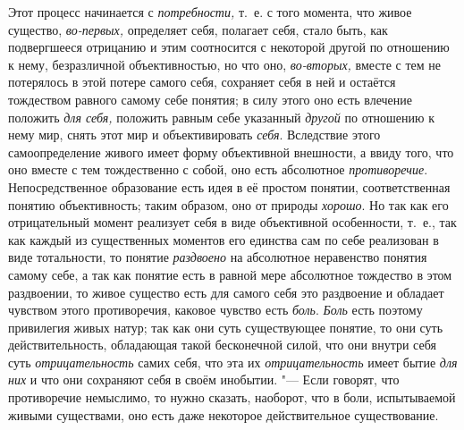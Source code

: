 Этот процесс начинается с
{\em потребности,} т.~е.
с того момента, что живое существо,
{\em во-первых,}
определяет себя, полагает себя, стало быть, как подвергшееся
отрицанию и этим соотносится с некоторой другой по отношению к нему,
безразличной объективностью, но что оно,
{\em во-вторых,} вместе с
тем не потерялось в этой потере самого себя, сохраняет себя в ней и
остаётся тождеством равного самому себе понятия; в силу этого оно есть
влечение положить {\em для себя,}
положить равным себе указанный
{\em другой} по отношению
к нему мир, снять этот мир и объективировать
{\em себя}. Вследствие
этого самоопределение живого имеет форму объективной внешности, а ввиду
того, что оно вместе с тем тождественно с собой, оно есть абсолютное
{\em противоречие}.
Непосредственное образование есть идея в её простом понятии,
соответственная понятию объективность; таким образом, оно от природы
{\em хорошо}. Но так как
его отрицательный момент реализует себя в виде объективной особенности,
т.~е., так как каждый из существенных моментов его единства сам по себе
реализован в виде тотальности, то понятие
{\em раздвоено} на
абсолютное неравенство понятия самому себе, а так как понятие есть в равной
мере абсолютное тождество в этом раздвоении, то живое существо есть для
самого себя это раздвоение и обладает чувством этого противоречия, каковое
чувство есть {\em боль}.
{\em Боль} есть поэтому
привилегия живых натур; так как они суть существующее понятие, то они суть
действительность, обладающая такой бесконечной силой, что они внутри себя
суть {\em отрицательность}
самих себя, что эта их
{\em отрицательность}
имеет бытие {\em для них}
и что они сохраняют себя в своём инобытии. "---
Если говорят, что противоречие немыслимо, то нужно сказать,
наоборот, что в боли, испытываемой живыми существами, оно есть даже
некоторое действительное существование.

